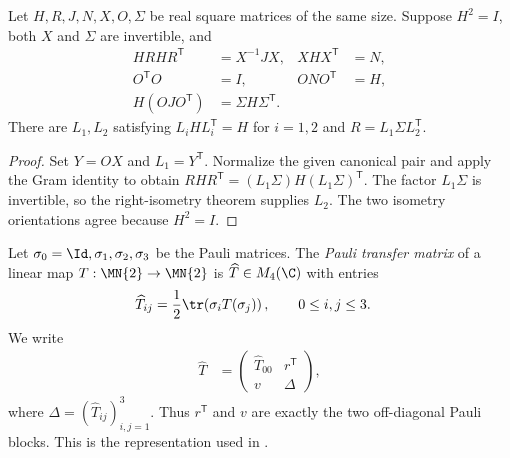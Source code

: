 \begin{theorem}
    \label{thm:decomposition_supplied_canonical_pair}
    \leanok
    Let $H,R,J,N,X,O,\Sigma$ be real square matrices of the same size.
    Suppose $H^2=I$, both $X$ and $\Sigma$ are invertible, and
    \begin{align}
        HRHR^{\mathsf T}&=X^{-1}JX,& XHX^{\mathsf T}&=N,\\
        O^{\mathsf T}O&=I,& ONO^{\mathsf T}&=H,\\
        H(OJO^{\mathsf T})&=\Sigma H\Sigma^{\mathsf T}.
    \end{align}
    There are $L_1,L_2$ satisfying $L_iHL_i^{\mathsf T}=H$ for
    $i=1,2$ and $R=L_1\Sigma L_2^{\mathsf T}$.
\end{theorem}
\begin{proof}\leanok
    Set $Y=OX$ and $L_1=Y^{\mathsf T}$. Normalize the given canonical
    pair and apply the Gram identity to obtain
    $RHR^{\mathsf T}=(L_1\Sigma)H(L_1\Sigma)^{\mathsf T}$.
    The factor $L_1\Sigma$ is invertible, so the right-isometry theorem
    supplies $L_2$. The two isometry orientations agree because $H^2=I$.
\end{proof}


\begin{definition}\label{def:pauli_transfer_matrix}
    \leanok
    Let $\sigma_0=\Id,\sigma_1,\sigma_2,\sigma_3$ be the Pauli matrices.  The
    \emph{Pauli transfer matrix} of a linear map
    $T:\MN{2}\to\MN{2}$ is $\widehat T\in M_4(\C)$ with entries
    \begin{align}
        \widehat T_{ij}
        &=\frac12\tr\!\left(\sigma_iT(\sigma_j)\right),
        \qquad 0\leq i,j\leq3.
        \label{eq:pauli_transfer_entries}
    \end{align}
    We write
    \begin{align}
        \widehat T
        &=
        \begin{pmatrix}
            \widehat T_{00} & r^{\mathsf T}\\
            v & \Delta
        \end{pmatrix},
        \label{eq:pauli_transfer_blocks}
    \end{align}
    where $\Delta=(\widehat T_{ij})_{i,j=1}^{3}$.  Thus $r^{\mathsf T}$ and
    $v$ are exactly the two off-diagonal Pauli blocks.  This is the
    representation used in \cite[Section~2.4, Eq.~(2.39)]{Wolf2012Quantum}.
\end{definition}

